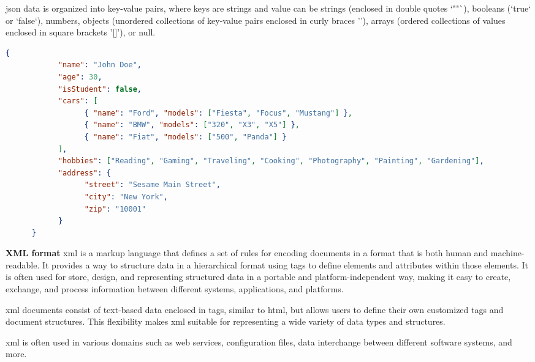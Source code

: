 \begin{multicols}{2}
      \acrshort{json} data is organized into key-value pairs, where keys are strings and value can be strings (enclosed
      in double quotes `""`), booleans (`true` or `false`), numbers, objects (unordered collections of key-value pairs
      enclosed in curly braces '{}'), arrays (ordered collections of values enclosed in square brackets '[]'), or null.
\end{multicols}

\begin{lstlisting}[language=JSON, caption=Example of a JSON response, label=lst:jsonresponse]
      {
            "name": "John Doe",
            "age": 30,
            "isStudent": false,
            "cars": [
                  { "name": "Ford", "models": ["Fiesta", "Focus", "Mustang"] },
                  { "name": "BMW", "models": ["320", "X3", "X5"] },
                  { "name": "Fiat", "models": ["500", "Panda"] }
            ],
            "hobbies": ["Reading", "Gaming", "Traveling", "Cooking", "Photography", "Painting", "Gardening"],
            "address": {
                  "street": "Sesame Main Street",
                  "city": "New York",
                  "zip": "10001"
            }
      }
\end{lstlisting}

\begin{multicols}{2}
      \textbf{XML format}
      \acrshort{xml} is a markup language that defines a set of rules for encoding documents in a format that
      is both human and machine-readable. It provides a way to structure data in a hierarchical format using
      tags to define elements and attributes within those elements. It is often used for store, design, and
      representing structured data in a portable and platform-independent way, making it easy to create,
      exchange, and process information between different systems, applications, and platforms.

      \acrshort{xml} documents consist of text-based data enclosed in tags, similar to \acrshort{html}, but
      allows users to define their own customized tags and document structures. This flexibility makes
      \acrshort{xml} suitable for representing a wide variety of data types and structures.

      \acrshort{xml} is often used in various domains such as web services, configuration files, data
      interchange between different software systems, and more.
\end{multicols}

